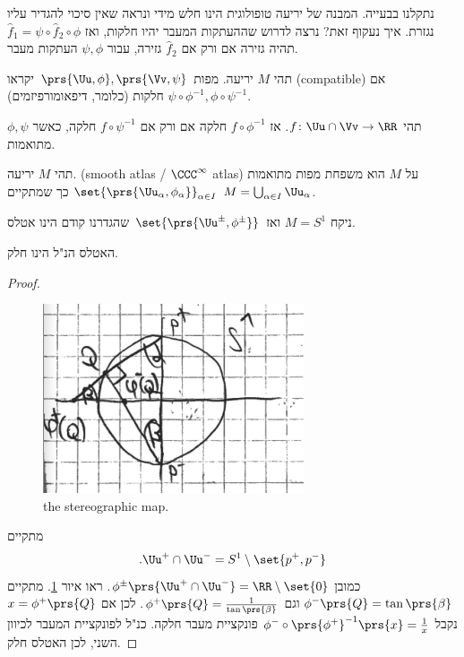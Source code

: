 \documentclass[a4paper,10pt,twoside,openany]{book}
\begin{document}
נתקלנו בבעייה. המבנה של יריעה טופולוגית הינו חלש מידי ונראה שאין סיכוי להגדיר עליו נגזרת. איך נעקוף זאת?
נרצה לדרוש שההעתקות המעבר יהיו חלקות, ואז
$\hat{f}_1 = \psi \circ \hat{f}_2 \circ \phi$
תהיה גזירה אם ורק אם
$\hat{f}_2$
גזירה, עבור
$\psi, \phi$
העתקות מעבר.\\
\begin{definition}
תהי
$M$
יריעה. מפות
$\prs{\Uu, \phi}, \prs{\Vv, \psi}$
יקראו
(\textenglish{compatible})
אם
$\psi \circ \phi^{-1}, \phi \circ \psi^{-1}$
חלקות (כלומר, דיפאומורפיזמים).
\end{definition}
\begin{exercise}
תהי
$f \colon \Uu \cap \Vv \to \RR$.
אז
$f \circ \phi^{-1}$
חלקה אם ורק אם
$f \circ \psi^{-1}$
חלקה, כאשר
$\phi,\psi$
מתואמות.
\end{exercise}
\begin{definition}
תהי
$M$
יריעה.
\textenglish{(smooth atlas / $\CCC^{\infty}$ atlas)}
על
$M$
הוא משפחת מפות מתואמות
$\set{\prs{\Uu_{\alpha}, \phi_{\alpha}}}_{\alpha \in I}$
כך שמתקיים
$M = \bigcup_{\alpha \in I} \Uu_{\alpha}$.
\end{definition}
\begin{example}
ניקח
$M = S^1$
ואז
$\set{\prs{\Uu^{\pm}, \phi^{\pm}}}$
שהגדרנו קודם הינו אטלס.
\end{example}
\begin{claim}
האטלס הנ"ל הינו חלק.
\end{claim}
\begin{proof}
\begin{figure}[h!]
\caption{the stereographic map.}
\label{stereographic}
\includegraphics[scale=1]{sources/stereographic}
\end{figure}
מתקיים
\[\text{.} \Uu^+ \cap \Uu^- = S^1 \setminus \set{p^+, p^-}\]
כמובן
$\phi^{\pm}\prs{\Uu^+ \cap \Uu^-} = \RR \setminus \set{0}$.
ראו איור
\ref{stereographic}.
מתקיים
$\phi^-\prs{Q} = \tan\prs{\beta}$
וגם
$\phi^+\prs{Q} = \frac{1}{\tan\prs{\beta}}$.
לכן אם
$x = \phi^+\prs{Q}$
נקבל
$\phi^- \circ \prs{\phi^+}^{-1}\prs{x} = \frac{1}{x}$
פונקציית מעבר חלקה.
כנ"ל לפונקציית המעבר לכיוון השני, לכן האטלס חלק.
\end{proof}
\end{document}
